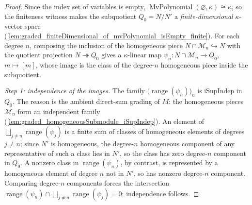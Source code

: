 \begin{proof}
    \leanok
  Since the index set of variables is empty,
  \(\operatorname{MvPolynomial}(\varnothing, \kappa) \cong \kappa\), so the finiteness
  witness makes the subquotient \(Q_0 = N/N'\) a \emph{finite-dimensional}
  \(\kappa\)-vector space
  (\cref{lem:graded_finiteDimensional_of_mvPolynomial_isEmpty_finite}). For each
  degree \(n\), composing the inclusion of the homogeneous piece
  \(N \cap \mathcal{M}_n \hookrightarrow N\) with the quotient projection
  \(N \twoheadrightarrow Q_0\) gives a \(\kappa\)-linear map
  \(\psi_n : N \cap \mathcal{M}_n \to Q_0\), \(m \mapsto [m]\), whose image is the
  class of the degree-\(n\) homogeneous piece inside the subquotient.

  \emph{Step 1: independence of the images.} The family
  \(\bigl(\operatorname{range}(\psi_n)\bigr)_{n}\) is \(\mathrm{iSupIndep}\) in
  \(Q_0\). The reason is the ambient direct-sum grading of \(M\): the homogeneous
  pieces \(\mathcal{M}_n\) form an independent family
  (\cref{lem:graded_homogeneousSubmodule_iSupIndep}). An element of
  \(\bigsqcup_{j \ne n} \operatorname{range}(\psi_j)\) is a finite sum of classes of
  homogeneous elements of degrees \(j \ne n\); since \(N'\) is homogeneous, the
  degree-\(n\) homogeneous component of any representative of such a class lies in
  \(N'\), so the class has zero degree-\(n\) component in \(Q_0\). A nonzero class in
  \(\operatorname{range}(\psi_n)\), by contrast, is represented by a homogeneous
  element of degree \(n\) not in \(N'\), so has nonzero degree-\(n\) component.
  Comparing degree-\(n\) components forces the intersection
  \(\operatorname{range}(\psi_n) \cap \bigsqcup_{j \ne n} \operatorname{range}(\psi_j)
  = 0\); independence follows.


\end{proof}
